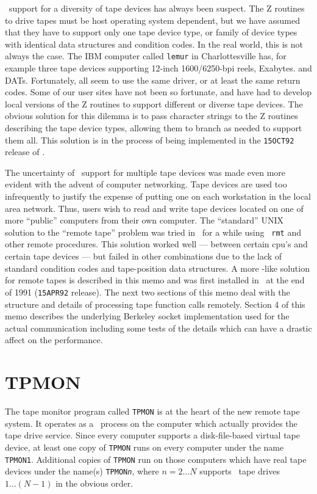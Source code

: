 \AIPS\ support for a diversity of tape devices has always been
suspect.  The Z routines to drive tapes must be host operating system
dependent, but we have assumed that they have to support only one tape
device type, or family of device types with identical data structures
and condition codes.  In the real world, this is not always the case.
The IBM computer called {\tt lemur} in Charlottesville has, for
example three tape devices supporting 12-inch 1600/6250-bpi reels,
Exabytes. and DATs.  Fortunately, all seem to use the same driver, or
at least the same return codes.  Some of our user sites have not been
so fortunate, and have had to develop local versions of the Z routines
to support different or diverse tape devices.  The obvious solution
for this dilemma is to pass character strings to the Z routines
describing the tape device types, allowing them to branch as needed to
support them all.  This solution is in the process of being
implemented in the {\tt 15OCT92} release of \AIPS.

The uncertainty of \AIPS\ support for multiple tape devices was made
even more evident with the advent of computer networking.  Tape
devices are used too infrequently to justify the expense of putting
one on each workstation in the local area network.  Thus, users wish
to read and write tape devices located on one of more ``public''
computers from their own computer.  The ``standard'' UNIX solution to
the ``remote tape'' problem was tried in \AIPS\ for a while using {\tt
rmt} and other remote procedures.  This solution worked well ---
between certain cpu's and certain tape devices --- but failed in other
combinations due to the lack of standard condition codes and
tape-position data structures.  A more \AIPS-like solution for remote
tapes is described in this memo and was first installed in \AIPS\ at
the end of 1991 ({\tt 15APR92} release).  The next two sections of
this memo deal with the structure and details of processing tape
function calls remotely.  Section 4 of this memo describes the
underlying Berkeley socket implementation used for the actual
communication including some tests of the details which can have a
drastic affect on the performance.

\section{TPMON}

The tape monitor program called {\tt TPMON} is at the heart of the new
remote tape system.  It operates as a \daemon\ process on the computer
which actually provides the tape drive service.  Since every computer
supports a disk-file-based virtual tape device, at least one copy of
{\tt TPMON} runs on every computer under the name \hbox{{\tt TPMON1}}.
Additional copies of {\tt TPMON} run on those computers which have
real tape devices under the name(s) {\tt TPMON{\it n}}, where
$n = 2 \ldots N$ supports \AIPS\ tape drives $1 \ldots (N-1)$ in the
obvious order.

